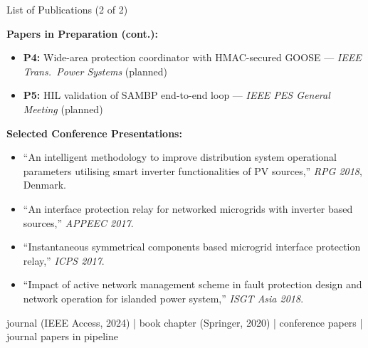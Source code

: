 \documentclass[aspectratio=169, 10pt]{beamer}
\begin{document}
\begin{frame}{List of Publications (2 of 2)}
  \vspace{0.2cm}

  {\small\bfseries\color{iitmMaroon} Papers in Preparation (cont.):}
  \vspace{4pt}

  \begin{itemize}\scriptsize
    \setlength\itemsep{4pt}
    \item \textbf{P4:} Wide-area protection coordinator with HMAC-secured GOOSE
          --- \textit{IEEE Trans.\ Power Systems} (planned)
    \item \textbf{P5:} HIL validation of SAMBP end-to-end loop
          --- \textit{IEEE PES General Meeting} (planned)
  \end{itemize}

  \vspace{0.4cm}
  {\small\bfseries\color{iitmMaroon} Selected Conference Presentations:}
  \vspace{4pt}

  \begin{itemize}\scriptsize
    \setlength\itemsep{4pt}
    \item ``An intelligent methodology to improve distribution system operational
          parameters utilising smart inverter functionalities of PV sources,''
          \textit{RPG 2018}, Denmark.
    \item ``An interface protection relay for networked microgrids with inverter
          based sources,''
          \textit{APPEEC 2017}.
    \item ``Instantaneous symmetrical components based microgrid interface
          protection relay,''
          \textit{ICPS 2017}.
    \item ``Impact of active network management scheme in fault protection design
          and network operation for islanded power system,''
          \textit{ISGT Asia 2018}.
  \end{itemize}

  \vspace{0.3cm}
  \begin{tcolorbox}[result]
    \scriptsize{} journal (IEEE Access, 2024) \enspace| book chapter (Springer, 2020) \enspace| conference papers \enspace| journal papers in pipeline
  \end{tcolorbox}


\end{frame}
\end{document}
